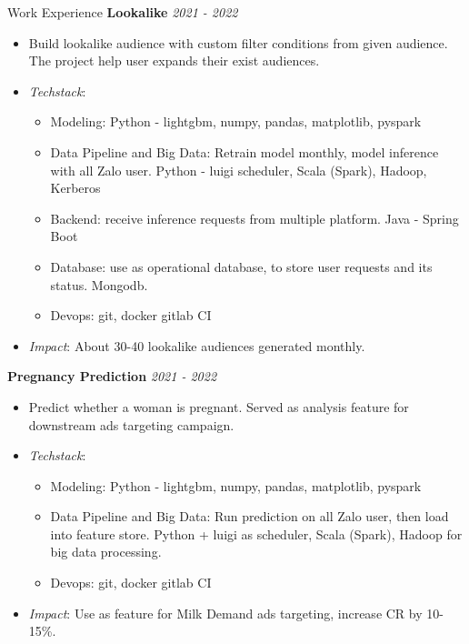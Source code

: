 \documentclass{resume} %
\begin{document}
\begin{rSection}{Work Experience}
\textbf{Lookalike} \hfill {\em \textit{2021 - 2022}}
\begin{itemize}
    \item Build lookalike audience with custom filter conditions from given audience. The project help user expands their exist audiences.
    \item \textit{Techstack}:
    \begin{itemize}
        \item Modeling: Python - lightgbm, numpy, pandas, matplotlib, pyspark
        \item Data Pipeline and Big Data: Retrain model monthly,  model inference with all Zalo user. Python - luigi scheduler, Scala (Spark), Hadoop, Kerberos
        \item Backend: receive inference requests from multiple platform. Java - Spring Boot
        \item Database: use as operational database, to store user requests and its status. Mongodb.
        \item Devops: git, docker gitlab CI
    \end{itemize} 
    \item \textit{Impact}: About 30-40 lookalike audiences generated monthly.
\end{itemize}

\textbf{Pregnancy Prediction } \hfill {\em \textit{2021 - 2022}}
\begin{itemize}
    \item Predict whether a woman is pregnant. Served as analysis feature for downstream ads targeting campaign.
    \item \textit{Techstack}:
    \begin{itemize}
        \item Modeling: Python - lightgbm, numpy, pandas, matplotlib, pyspark
        \item Data Pipeline and Big Data: Run prediction on all Zalo user, then load into feature store. Python + luigi as scheduler, Scala (Spark), Hadoop for big data processing.
        \item Devops: git, docker gitlab CI
    \end{itemize} 
    \item \textit{Impact}: Use as feature for Milk Demand ads targeting, increase CR by 10-15\%.
\end{itemize}


\end{rSection}
\end{document}
